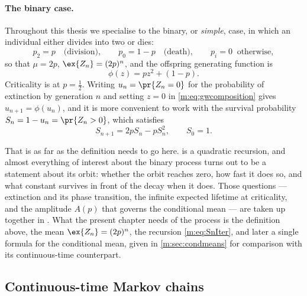 \paragraph{The binary case.}
Throughout this thesis we specialise to the binary, or \emph{simple}, case, in
which an individual either divides into two or dies:
\begin{equation}
\label{m:eq:binarylaw}
p_2 = p \quad\text{(division)},
\qquad
p_0 = 1-p \quad\text{(death)},
\qquad
p_i = 0 \ \text{ otherwise},
\end{equation}
so that $\mu=2p$, $\ex{Z_n}=(2p)^n$, and the offspring generating function is
\begin{equation}
\label{m:eq:pgfbinary}
\phi(z) = pz^2+(1-p) .
\end{equation}
Criticality is at $p=\tfrac12$. Writing $u_n = \pr{Z_n=0}$ for the probability of
extinction by generation $n$ and setting $z=0$ in \cref{m:eq:gwcomposition} gives
$u_{n+1}=\phi(u_n)$, and it is more convenient to work with the survival
probability $S_n = 1-u_n = \pr{Z_n>0}$, which satisfies
\begin{equation}
\label{m:eq:SnIter}
S_{n+1} = 2pS_n - pS_n^2,
\qquad S_0 = 1 .
\end{equation}

That is as far as the definition needs to go here.  is a quadratic
recursion, and almost everything of interest about the binary process turns out to
be a statement about its orbit: whether the orbit reaches zero, how fast it does
so, and what constant survives in front of the decay when it does. Those questions
--- extinction and its phase transition, the infinite expected lifetime at
criticality, and the amplitude $A(p)$ that governs the conditional mean --- are
taken up together in \ChA. What the present chapter needs of the process is the
definition above, the mean $\ex{Z_n}=(2p)^n$, the recursion \cref{m:eq:SnIter}, and
later a single formula for the conditional mean, given in \cref{m:sec:condmeans}
for comparison with its continuous-time counterpart.

\subsection{Continuous-time Markov chains}
\label{m:sec:ctmc}

